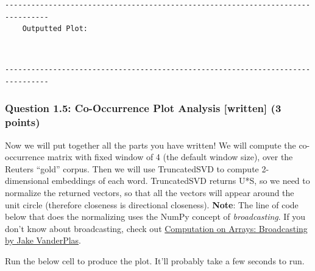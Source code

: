 \documentclass[11pt]{article}
\begin{document}
\begin{Verbatim}[commandchars=\\\{\}]
    --------------------------------------------------------------------------------
    Outputted Plot:
\end{Verbatim}

\begin{center}
\end{center}
{ \hspace*{\fill} \\}

\begin{Verbatim}[commandchars=\\\{\}]
    --------------------------------------------------------------------------------
\end{Verbatim}

\subsubsection{Question 1.5: Co-Occurrence Plot Analysis {[}written{]}
(3
points)}\label{question-1.5-co-occurrence-plot-analysis-written-3-points}

Now we will put together all the parts you have written! We will compute
the co-occurrence matrix with fixed window of 4 (the default window
size), over the Reuters ``gold'' corpus. Then we will use TruncatedSVD
to compute 2-dimensional embeddings of each word. TruncatedSVD returns
U*S, so we need to normalize the returned vectors, so that all the
vectors will appear around the unit circle (therefore closeness is
directional closeness). \textbf{Note}: The line of code below that does
the normalizing uses the NumPy concept of \emph{broadcasting}. If you
don't know about broadcasting, check out
\href{https://jakevdp.github.io/PythonDataScienceHandbook/02.05-computation-on-arrays-broadcasting.html}{Computation
    on Arrays: Broadcasting by Jake VanderPlas}.

Run the below cell to produce the plot. It'll probably take a few
seconds to run.
\end{document}
